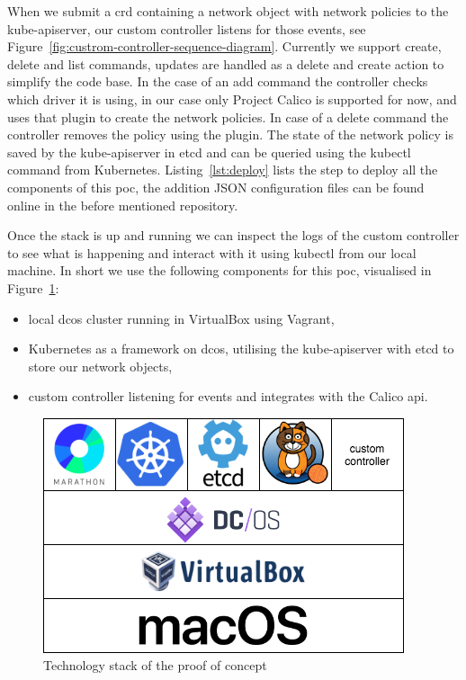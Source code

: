 When we submit a \gls{crd} containing a network object with network policies to the kube-apiserver, our custom controller listens for those events, see Figure~\ref{fig:custrom-controller-sequence-diagram}. Currently we support create, delete and list commands, updates are handled as a delete and create action to simplify the code base. In the case of an add command the controller checks which driver it is using, in our case only Project Calico is supported for now, and uses that plugin to create the network policies. In case of a delete command the controller removes the policy using the plugin. The state of the network policy is saved by the kube-apiserver in etcd and can be queried using the kubectl command from Kubernetes. Listing~\ref{lst:deploy} lists the step to deploy all the components of this \gls{poc}, the addition JSON configuration files can be found online in the before mentioned repository. 

Once the stack is up and running we can inspect the logs of the custom controller to see what is happening and interact with it using kubectl from our local machine. In short we use the following components for this \gls{poc}, visualised in Figure~\ref{fig:poc-stack}:
\begin{itemize}
    \item local \gls{dcos} cluster running in VirtualBox\cite{virtualbox} using Vagrant\cite{vagrant},
    \item Kubernetes as a framework on \gls{dcos}, utilising the kube-apiserver with etcd to store our network objects,
    \item custom controller listening for events and integrates with the Calico \gls{api}.
\end{itemize}

\begin{figure}
    \centering
    \includegraphics[width=0.6\columnwidth]{images/poc-stack}
    \caption{Technology stack of the proof of concept}
    \label{fig:poc-stack}
\end{figure}
